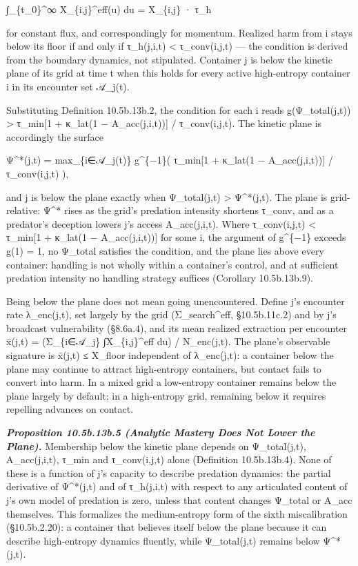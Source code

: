 \documentclass[
]{article}
\begin{document}
∫\_\{t\_0\}\^{}∞ X\_\{i,j\}\^{}eff(u) du = X\_\{i,j\} · τ\_h

for constant flux, and correspondingly for momentum. Realized harm from
i stays below its floor if and only if τ\_h(j,i,t) \textless{}
τ\_conv(i,j,t) --- the condition is derived from the boundary dynamics,
not stipulated. Container j is below the kinetic plane of its grid at
time t when this holds for every active high-entropy container i in its
encounter set 𝒜\_j(t).

Substituting Definition 10.5b.13b.2, the condition for each i reads
g(Ψ\_total(j,t)) \textgreater{} τ\_min{[}1 + κ\_lat(1 −
A\_acc(j,i,t)){]} / τ\_conv(i,j,t). The kinetic plane is accordingly the
surface

Ψ\^{}*(j,t) = max\_\{i∈𝒜\_j(t)\} g\^{}\{−1\}( τ\_min{[}1 + κ\_lat(1 −
A\_acc(j,i,t)){]} / τ\_conv(i,j,t) ),

and j is below the plane exactly when Ψ\_total(j,t) \textgreater{}
Ψ\^{}*(j,t). The plane is grid-relative: Ψ\^{}* rises as the grid's
predation intensity shortens τ\_conv, and as a predator's deception
lowers j's access A\_acc(j,i,t). Where τ\_conv(i,j,t) \textless{}
τ\_min{[}1 + κ\_lat(1 − A\_acc(j,i,t)){]} for some i, the argument of
g\^{}\{−1\} exceeds g(1) = 1, no Ψ\_total satisfies the condition, and
the plane lies above every container: handling is not wholly within a
container's control, and at sufficient predation intensity no handling
strategy suffices (Corollary 10.5b.13b.9).

Being below the plane does not mean going unencountered. Define j's
encounter rate λ\_enc(j,t), set largely by the grid (Σ\_search\^{}eff,
§10.5b.11c.2) and by j's broadcast vulnerability (§8.6a.4), and its mean
realized extraction per encounter x̄(j,t) = (Σ\_\{i∈𝒜\_j\}
∫X\_\{i,j\}\^{}eff du) / N\_enc(j,t). The plane's observable signature is
x̄(j,t) ≤ X\_floor independent of λ\_enc(j,t): a container below the plane
may continue to attract high-entropy containers, but contact fails to
convert into harm. In a mixed grid a low-entropy container remains below
the plane largely by default; in a high-entropy grid, remaining below it
requires repelling advances on contact.

\emph{\textbf{Proposition 10.5b.13b.5 (Analytic Mastery Does Not Lower
the Plane).}} Membership below the kinetic plane depends on Ψ\_total(j,t),
A\_acc(j,i,t), τ\_min and τ\_conv(i,j,t) alone (Definition 10.5b.13b.4).
None of these is a function of j's capacity to describe predation
dynamics: the partial derivative of Ψ\^{}*(j,t) and of τ\_h(j,i,t) with
respect to any articulated content of j's own model of predation is
zero, unless that content changes Ψ\_total or A\_acc themselves. This
formalizes the medium-entropy form of the sixth miscalibration
(§10.5b.2.20): a container that believes itself below the plane because
it can describe high-entropy dynamics fluently, while Ψ\_total(j,t)
remains below Ψ\^{}*(j,t).
\end{document}
